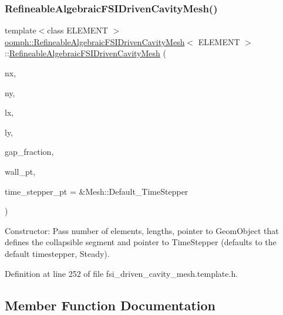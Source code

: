 \subsubsection{\texorpdfstring{Refineable\+Algebraic\+F\+S\+I\+Driven\+Cavity\+Mesh()}{RefineableAlgebraicFSIDrivenCavityMesh()}}
{\footnotesize\ttfamily template$<$class E\+L\+E\+M\+E\+NT $>$ \\
\hyperlink{classoomph_1_1RefineableAlgebraicFSIDrivenCavityMesh}{oomph\+::\+Refineable\+Algebraic\+F\+S\+I\+Driven\+Cavity\+Mesh}$<$ E\+L\+E\+M\+E\+NT $>$\+::\hyperlink{classoomph_1_1RefineableAlgebraicFSIDrivenCavityMesh}{Refineable\+Algebraic\+F\+S\+I\+Driven\+Cavity\+Mesh} (\begin{DoxyParamCaption}\item[{const unsigned \&}]{nx,  }\item[{const unsigned \&}]{ny,  }\item[{const double \&}]{lx,  }\item[{const double \&}]{ly,  }\item[{const double \&}]{gap\+\_\+fraction,  }\item[{Geom\+Object $\ast$}]{wall\+\_\+pt,  }\item[{Time\+Stepper $\ast$}]{time\+\_\+stepper\+\_\+pt = {\ttfamily \&Mesh\+:\+:Default\+\_\+TimeStepper} }\end{DoxyParamCaption})\hspace{0.3cm}{\ttfamily [inline]}}



Constructor\+: Pass number of elements, lengths, pointer to Geom\+Object that defines the collapsible segment and pointer to Time\+Stepper (defaults to the default timestepper, Steady). 



Definition at line 252 of file fsi\+\_\+driven\+\_\+cavity\+\_\+mesh.\+template.\+h.



\subsection{Member Function Documentation}
\mbox{\label{classoomph_1_1RefineableAlgebraicFSIDrivenCavityMesh_aa68685323573763e1ded0cceed5ad14f}} 
